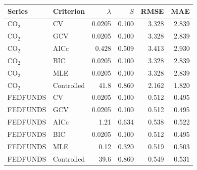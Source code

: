 \begin{tabular}{llrrrr}
\toprule
Series & Criterion & $\lambda$ & $S$ & RMSE & MAE \\
\midrule
CO$_2$ & CV & 0.0205 & 0.100 & 3.328 & 2.839 \\
CO$_2$ & GCV & 0.0205 & 0.100 & 3.328 & 2.839 \\
CO$_2$ & AICc & 0.428 & 0.509 & 3.413 & 2.930 \\
CO$_2$ & BIC & 0.0205 & 0.100 & 3.328 & 2.839 \\
CO$_2$ & MLE & 0.0205 & 0.100 & 3.328 & 2.839 \\
CO$_2$ & Controlled & 41.8 & 0.860 & 2.162 & 1.820 \\
\midrule
FEDFUNDS & CV & 0.0205 & 0.100 & 0.512 & 0.495 \\
FEDFUNDS & GCV & 0.0205 & 0.100 & 0.512 & 0.495 \\
FEDFUNDS & AICc & 1.21 & 0.634 & 0.538 & 0.522 \\
FEDFUNDS & BIC & 0.0205 & 0.100 & 0.512 & 0.495 \\
FEDFUNDS & MLE & 0.12 & 0.320 & 0.519 & 0.503 \\
FEDFUNDS & Controlled & 39.6 & 0.860 & 0.549 & 0.531 \\
\bottomrule
\end{tabular}
